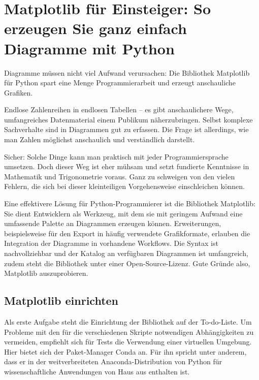 %
%
%
%





\chapter{Matplotlib für Einsteiger: So erzeugen Sie ganz einfach Diagramme mit Python}

Diagramme müssen nicht viel Aufwand verursachen: Die Bibliothek Matplotlib für Python spart eine Menge Programmierarbeit und erzeugt anschauliche Grafiken.

Endlose Zahlenreihen in endlosen Tabellen – es gibt anschaulichere Wege, umfangreiches Datenmaterial einem Publikum näherzubringen. Selbst komplexe Sachverhalte sind in Diagrammen gut zu erfassen. Die Frage ist allerdings, wie man Zahlen möglichst anschaulich und verständlich darstellt.

Sicher: Solche Dinge kann man praktisch mit jeder Programmiersprache umsetzen. Doch dieser Weg ist eher mühsam und setzt fundierte Kenntnisse in Mathematik und Trigonometrie voraus. Ganz zu schweigen von den vielen Fehlern, die sich bei dieser kleinteiligen Vorgehensweise einschleichen können.

Eine effektivere Lösung für Python-Programmierer ist die Bibliothek Matplotlib: Sie dient Entwicklern als Werkzeug, mit dem sie mit geringem Aufwand eine umfassende Palette an Diagrammen erzeugen können. Erweiterungen, beispielsweise für den Export in häufig verwendete Grafikformate, erlauben die Integration der Diagramme in vorhandene Workflows. Die Syntax ist nachvollziehbar und der Katalog an verfügbaren Diagrammen ist umfangreich, zudem steht die Bibliothek unter einer Open-Source-Lizenz. Gute Gründe also, Matplotlib auszuprobieren.

\section{Matplotlib einrichten}

Als erste Aufgabe steht die Einrichtung der Bibliothek auf der To-do-Liste. Um Probleme mit den für die verschiedenen Skripte notwendigen Abhängigkeiten zu vermeiden, empfiehlt sich für Tests die Verwendung einer virtuellen Umgebung. Hier bietet sich der Paket-Manager Conda an. Für ihn spricht unter anderem, dass er in der weitverbreiteten Anaconda-Distribution von Python für wissenschaftliche Anwendungen von Haus aus enthalten ist.

